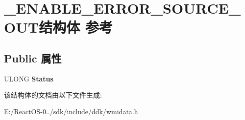 \hypertarget{struct___e_n_a_b_l_e___e_r_r_o_r___s_o_u_r_c_e___o_u_t}{}\section{\+\_\+\+E\+N\+A\+B\+L\+E\+\_\+\+E\+R\+R\+O\+R\+\_\+\+S\+O\+U\+R\+C\+E\+\_\+\+O\+U\+T结构体 参考}
\label{struct___e_n_a_b_l_e___e_r_r_o_r___s_o_u_r_c_e___o_u_t}
\subsection*{Public 属性}
\begin{DoxyCompactItemize}
\item 
\mbox{\label{struct___e_n_a_b_l_e___e_r_r_o_r___s_o_u_r_c_e___o_u_t_ae211b8db6898586c1f232b689868764e}} 
U\+L\+O\+NG {\bfseries Status}
\end{DoxyCompactItemize}


该结构体的文档由以下文件生成\+:\begin{DoxyCompactItemize}
\item 
E\+:/\+React\+O\+S-\/0../sdk/include/ddk/wmidata.\+h\end{DoxyCompactItemize}
